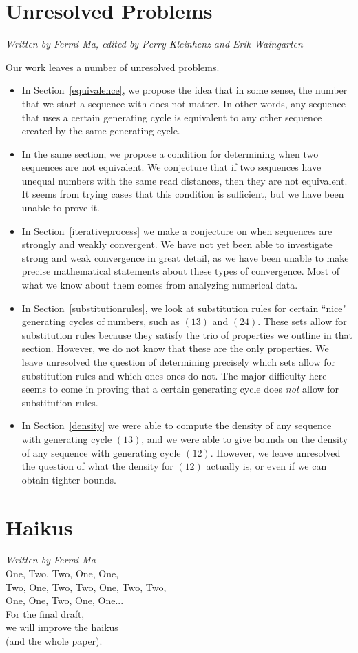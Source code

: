 \documentclass[runningheads,a4paper]{llncs}
\begin{document}
\section{Unresolved Problems}
\emph{Written by Fermi Ma, edited by Perry Kleinhenz and Erik Waingarten}

Our work leaves a number of unresolved problems. 

\begin{itemize}
\item In Section~\ref{equivalence}, we propose the idea that in some sense, the number that we start a sequence with does not matter. In other words, any sequence that uses a certain generating cycle is equivalent to any other sequence created by the same generating cycle.
\item In the same section, we propose a condition for determining when two sequences are not equivalent. We conjecture that if two sequences have unequal numbers with the same read distances, then they are not equivalent. It seems from trying cases that this condition is sufficient, but we have been unable to prove it.
\item In Section~\ref{iterativeprocess} we make a conjecture on when sequences are strongly and weakly convergent. We have not yet been able to investigate strong and weak convergence in great detail, as we have been unable to make precise mathematical statements about these types of convergence. Most of what we know about them comes from analyzing numerical data.
\item In Section~\ref{substitutionrules}, we look at substitution rules for certain ``nice" generating cycles of numbers, such as $(13)$ and $(24)$. These sets allow for substitution rules because they satisfy the trio of properties we outline in that section. However, we do not know that these are the only properties. We leave unresolved the question of determining precisely which sets allow for substitution rules and which ones ones do not. The major difficulty here seems to come in proving that a certain generating cycle does \emph{not} allow for substitution rules.
\item In Section~\ref{density} we were able to compute the density of any sequence with generating cycle $(13)$, and we were able to give bounds on the density of any sequence with generating cycle $(12)$. However, we leave unresolved the question of what the density for $(12)$ actually is, or even if we can obtain tighter bounds.
\end{itemize}

\section{Haikus}
\emph{Written by Fermi Ma}\\

\noindent One, Two, Two, One, One,\\
Two, One, Two, Two, One, Two, Two,\\
One, One, Two, One, One...\\

\noindent For the final draft,\\
we will improve the haikus\\
(and the whole paper).
\end{document}
